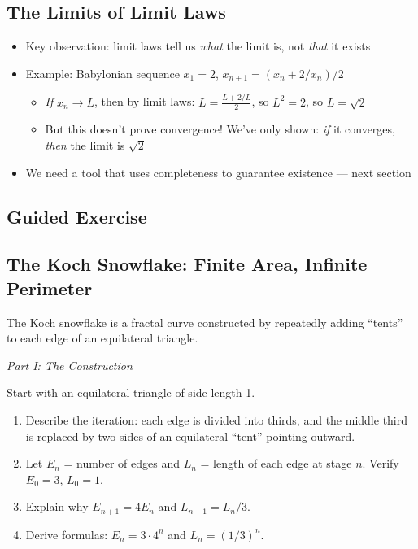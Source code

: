 \documentclass[
  10pt,
  letterpaper,
]{scrbook}
\providecommand{\tightlist}{%
  \setlength{\itemsep}{0pt}\setlength{\parskip}{0pt}}
\begin{document}
\subsection{The Limits of Limit Laws}\label{the-limits-of-limit-laws}

\begin{itemize}
\tightlist
\item
  Key observation: limit laws tell us \emph{what} the limit is, not
  \emph{that} it exists
\item
  Example: Babylonian sequence \(x_1 = 2\),
  \(x_{n+1} = (x_n + 2/x_n)/2\)

  \begin{itemize}
  \tightlist
  \item
    \emph{If} \(x_n \to L\), then by limit laws:
    \(L = \frac{L + 2/L}{2}\), so \(L^2 = 2\), so \(L = \sqrt{2}\)
  \item
    But this doesn't prove convergence! We've only shown: \emph{if} it
    converges, \emph{then} the limit is \(\sqrt{2}\)
  \end{itemize}
\item
  We need a tool that uses completeness to guarantee existence --- next
  section
\end{itemize}

\subsection{Guided Exercise}\label{guided-exercise-3}

\subsection{The Koch Snowflake: Finite Area, Infinite
Perimeter}\label{the-koch-snowflake-finite-area-infinite-perimeter}

The Koch snowflake is a fractal curve constructed by repeatedly adding
``tents'' to each edge of an equilateral triangle.

\emph{Part I: The Construction}

Start with an equilateral triangle of side length 1.

\begin{enumerate}
\def\labelenumi{(\alph{enumi})}
\item
  Describe the iteration: each edge is divided into thirds, and the
  middle third is replaced by two sides of an equilateral ``tent''
  pointing outward.
\item
  Let \(E_n\) = number of edges and \(L_n\) = length of each edge at
  stage \(n\). Verify \(E_0 = 3\), \(L_0 = 1\).
\item
  Explain why \(E_{n+1} = 4E_n\) and \(L_{n+1} = L_n/3\).
\item
  Derive formulas: \(E_n = 3 \cdot 4^n\) and \(L_n = (1/3)^n\).
\end{enumerate}
\end{document}
